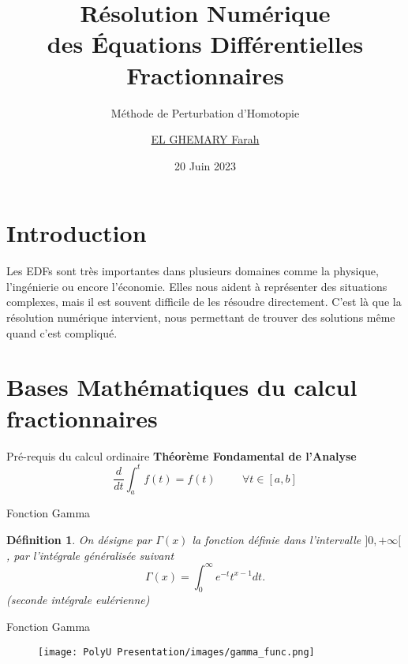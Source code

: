 \documentclass{sintefbeamer}
\title{Résolution Numérique\\ des Équations Différentielles Fractionnaires}
\subtitle{Méthode de Perturbation d'Homotopie}
\author{\href{mailto:elghemary@gmail.com}{EL GHEMARY Farah}}
\date{20 Juin 2023}
\newtheorem{def1}{Définition}
\begin{document}
\maketitle

\section{Introduction}

\begin{frame}{\hspace{1cm}}
    Les EDFs sont très importantes dans plusieurs domaines comme la physique, l'ingénierie ou encore l'économie. Elles nous aident à représenter des situations complexes, mais il est souvent difficile de les résoudre directement. C'est là que la résolution numérique intervient, nous permettant de trouver des solutions même quand c'est compliqué.
\end{frame}

\section{Bases Mathématiques du calcul fractionnaires}

\begin{frame}[fragile]{Pré-requis du calcul ordinaire}
\textbf{Théorème Fondamental de l'Analyse}\\
\begin{equation}\label{FTC}
        \frac{d}{dt}\int_a^t f(t) = f(t) \hspace{1cm} \forall t\in[a,b]
    \end{equation}
\end{frame}


\begin{frame}[fragile]{Fonction Gamma}
\begin{def1}
    On désigne par $\Gamma (x)$ la fonction définie dans l'intervalle $]0,+\infty[$, par l'intégrale généralisée suivant
    \begin{equation}
        \Gamma(x)=\int_{0}^{\infty} e^{-t} t^{x-1}dt.
    \end{equation}
    (seconde intégrale eulérienne)
\end{def1}
\end{frame}


\begin{frame}[fragile]{Fonction Gamma}
\begin{figure}
    \centering
    \texttt{[image: PolyU Presentation/images/gamma\_func.png]}
\end{figure}
\end{frame}
\end{document}

